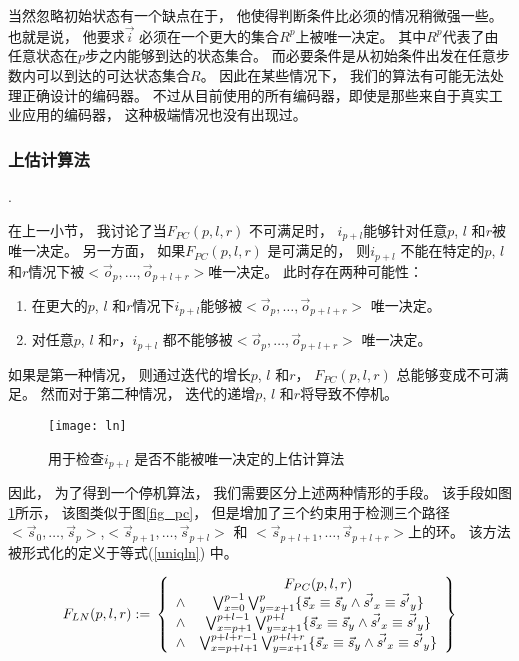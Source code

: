 当然忽略初始状态有一个缺点在于，
他使得判断条件比必须的情况稍微强一些。
也就是说，
他要求$\vec{i}$ 必须在一个更大的集合$R^p$上被唯一决定。
其中$R^p$代表了由任意状态在$p$步之内能够到达的状态集合。
而必要条件是从初始条件出发在任意步数内可以到达的可达状态集合$R$。
因此在某些情况下，
我们的算法有可能无法处理正确设计的编码器。
不过从目前使用的所有编码器，即使是那些来自于真实工业应用的编码器，
这种极端情况也没有出现过。


\subsubsection{上估计算法}\label{subsub_complete}.

在上一小节，
我讨论了当$F_{PC}(p,l,r)$ 不可满足时，
$i_{p+l}$能够针对任意$p$, $l$ 和$r$被唯一决定。
另一方面，
如果$F_{PC}(p,l,r)$ 是可满足的，
则$i_{p+l}$ 不能在特定的$p$, $l$ 和$r$情况下被$<\vec{o}_{p},\dots,\vec{o}_{p+l+r}>$唯一决定。
此时存在两种可能性：
\begin{enumerate}
 \item
在更大的$p$, $l$ 和$r$情况下$i_{p+l}$能够被$<\vec{o}_{p},\dots,\vec{o}_{p+l+r}>$ 唯一决定。
 \item
对任意$p$, $l$ 和$r$，$i_{p+l}$ 都不能够被$<\vec{o}_{p},\dots,\vec{o}_{p+l+r}>$ 唯一决定。
\end{enumerate}

如果是第一种情况，
则通过迭代的增长$p$, $l$ 和$r$，
$F_{PC}(p,l,r)$ 总能够变成不可满足。
然而对于第二种情况，
迭代的递增$p$, $l$ 和$r$将导致不停机。

\begin{figure}[b]
\begin{center}
\texttt{[image: ln]}
\end{center}
\caption{用于检查$i_{p+l}$ 是否不能被唯一决定的上估计算法}
  \label{fig_ln}
\end{figure}

因此，
为了得到一个停机算法，
我们需要区分上述两种情形的手段。
该手段如图\ref{fig_ln}所示，
该图类似于图\ref{fig_pc}，
但是增加了三个约束用于检测三个路径$<\vec{s}_{0},\dots,\vec{s}_{p}>$,$<\vec{s}_{p+1},\dots,\vec{s}_{p+l}>$ 和
$<\vec{s}_{p+l+1},\dots,\vec{s}_{p+l+r}>$上的环。
该方法被形式化的定义于等式(\ref{uniqln}) 中。

\begin{equation}\label{uniqln}
F_{LN}(p,l,r):=\\
\left\{
\begin{array}{cc}
&F_{PC}(p,l,r)\\
\wedge&\bigvee_{x=0}^{p-1}\bigvee_{y=x+1}^{p} \{\vec{s}_x\equiv \vec{s}_y\wedge \vec{s'}_x\equiv \vec{s'}_y\} \\
\wedge&\bigvee_{x=p+1}^{p+l-1}\bigvee_{y=x+1}^{p+l} \{\vec{s}_x\equiv \vec{s}_y\wedge \vec{s'}_x\equiv \vec{s'}_y\} \\
\wedge&\bigvee_{x=p+l+1}^{p+l+r-1}\bigvee_{y=x+1}^{p+l+r} \{\vec{s}_x\equiv \vec{s}_y\wedge \vec{s'}_x\equiv \vec{s'}_y\}
\end{array}
\right\}
\end{equation}

